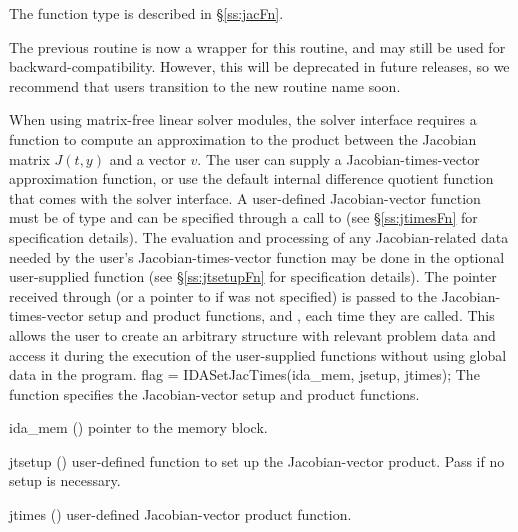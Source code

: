 {{  The function type  is described in \S\ref{ss:jacFn}.

  The previous routine  is now a wrapper for this
  routine, and may still be used for backward-compatibility.  However,
  this will be deprecated in future releases, so we recommend that
  users transition to the new routine name soon.
}
When using matrix-free linear solver modules, the {\idals} solver
interface requires a function to compute an approximation to the
product between the Jacobian matrix $J(t,y)$ and a vector $v$. The
user can supply a Jacobian-times-vector approximation function,
or use the default internal difference quotient function
that comes with the {\idals} solver interface.  A user-defined
Jacobian-vector function must be of type 
and can be specified through a call to 
(see \S\ref{ss:jtimesFn} for specification details).
The evaluation and processing of any Jacobian-related data needed by
the user's Jacobian-times-vector function may be done in the optional
user-supplied function  (see \S\ref{ss:jtsetupFn} for
specification details).
The pointer  received through  (or a
pointer to  if  was not specified)
is passed to the Jacobian-times-vector setup and product functions,  and
, each time they are called.  This allows the user to
create an arbitrary structure with relevant problem data and access it
during the execution of the user-supplied functions
without using global data in the program.
{
  flag = IDASetJacTimes(ida\_mem, jsetup, jtimes);
}
{
  The function  specifies the Jacobian-vector
  setup and product functions.
}
{
  \begin{args}
  \item[ida\_mem] ()
    pointer to the {\ida} memory block.
  \item[jtsetup] ()
    user-defined function to set up the Jacobian-vector product.
    Pass  if no setup is necessary.
  \item[jtimes] ()
    user-defined Jacobian-vector product function.

\end{args}}}
